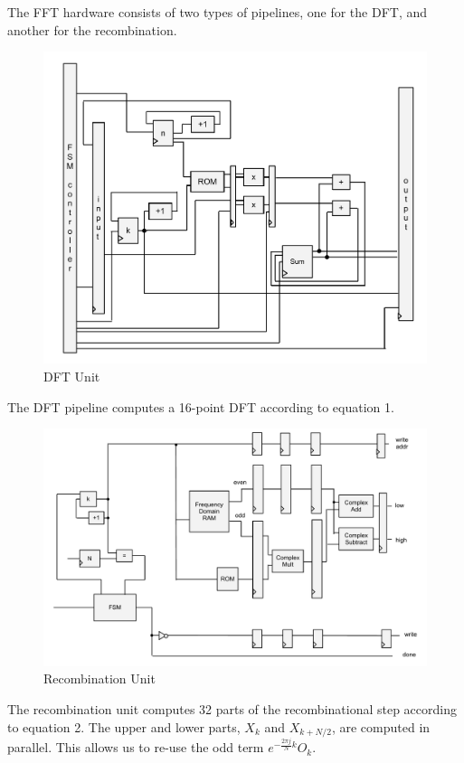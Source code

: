 \documentclass{article}
\begin{document}
The FFT hardware consists of two types of pipelines, one for the DFT,
and another for the recombination. 

\begin{figure}[H]
	\centering
	\includegraphics[scale=0.3]{dft-unit}
	\caption{DFT Unit}
\end{figure}

The DFT pipeline computes a 16-point DFT according to equation 1. 

\begin{figure}[H]
	\centering
	\includegraphics[scale=0.3]{recombinator}
	\caption{Recombination Unit}
\end{figure}

The recombination unit computes 32 parts of the recombinational step 
according to equation 2. The upper and lower parts, \(X_k\) and 
\(X_{k + N / 2}\), are computed in parallel. This allows us to re-use the 
odd term \(e^{-\frac{2\pi j}{N}k} O_k\).
\end{document}
